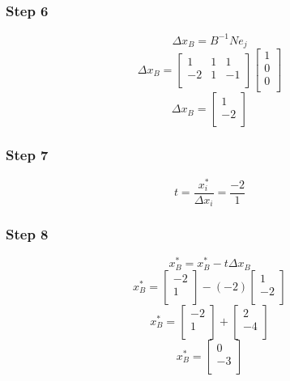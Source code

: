 \documentclass[14pt]{extarticle}
\begin{document}
\subsubsection*{Step 6}
\[
    \Delta x_B = B^{-1}N e_j
\]
\[
    \Delta x_B =
    \begin{bmatrix}
        1 & 1 & 1 \\
        -2 & 1 & -1 \\
    \end{bmatrix}
    \begin{bmatrix}
        1 \\
        0 \\
        0 \\
    \end{bmatrix}
\]
\[
    \Delta x_B =
    \begin{bmatrix}
        1 \\
        -2 \\
    \end{bmatrix}
\]

\subsubsection*{Step 7}
\[
    t = \frac{x^*_i}{\Delta x_i} = \frac{-2}{1}
\]

\subsubsection*{Step 8}
\[
    x^*_B = x^*_B - t \Delta x_B
\]
\[
    x^*_B = \begin{bmatrix}
        -2 \\
        1 \\
    \end{bmatrix}
    - (-2) \begin{bmatrix}
        1 \\
        -2 \\
    \end{bmatrix}
\]
\[
    x^*_B = \begin{bmatrix}
        -2 \\
        1 \\
    \end{bmatrix}
    + \begin{bmatrix}
        2 \\
        -4 \\
    \end{bmatrix}
\]
\[
    x^*_B = \begin{bmatrix}
        0 \\
        -3 \\
    \end{bmatrix}
\]
\end{document}
